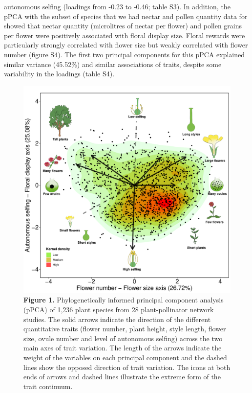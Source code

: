 \documentclass[
  12pt,
  a4paper,
]{article}
\begin{document}
autonomous selfing (loadings from -0.23 to -0.46; table S3). In addition, the pPCA with the subset of species that we had nectar and pollen quantity data for showed that nectar quantity (microlitres of nectar per flower) and pollen grains per flower were positively associated with floral display size. Floral rewards were particularly strongly correlated with flower size but weakly correlated with flower number (figure S4). The first two principal components for this pPCA explained similar variance (45.52\%) and similar associations of traits, despite some variability in the loadings (table S4).

\begin{figure}[H]

{\centering \includegraphics[width=0.85\linewidth]{output/figures/unnamed-chunk-2-1} 

}

\caption{\textbf{Figure 1.} Phylogenetically informed principal component analysis (pPCA) of 1,236 plant species from 28 plant-pollinator network studies. The solid arrows indicate the direction of the different quantitative traits (flower number, plant height, style length, flower size, ovule number and level of autonomous selfing) across the two main axes of trait variation. The length of the arrows indicate the weight of the variables on each principal component and the dashed lines show the opposed direction of trait variation. The icons at both ends of arrows and dashed lines illustrate the extreme form of the trait continuum.}\label{fig:unnamed-chunk-2}
\end{figure}
\end{document}
